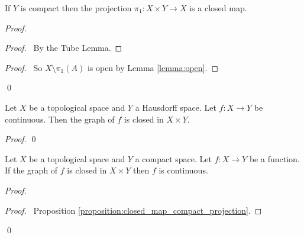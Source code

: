 \begin{proposition}
    \label{proposition:closed_map_compact_projection}
    If $Y$ is compact then the projection $\pi_1 : X \times Y \rightarrow X$
    is a closed map.
\end{proposition}

\begin{proof}
    \pf
    \begin{proof}
        \pf\ By the Tube Lemma.
    \end{proof}
    \qedstep
    \begin{proof}
        \pf\ So $X \setminus \pi_1(A)$ is open by Lemma \ref{lemma:open}.
    \end{proof}
    \qed
\end{proof}

\begin{proposition}
    \label{proposition:graph_closed}
    Let $X$ be a topological space and $Y$ a Hausdorff space.
    Let $f : X \rightarrow Y$ be continuous. Then the graph of $f$
    is closed in $X \times Y$.
\end{proposition}

\begin{proof}
    \qed
\end{proof}

\begin{theorem}
    Let $X$ be a topological space and $Y$ a compact space. Let $f : X \rightarrow Y$ be a function. 
    If the graph of $f$ is closed in $X \times Y$ then $f$ is continuous.
\end{theorem}

\begin{proof}
    \pf
        \begin{proof}
            \pf\ Proposition \ref{proposition:closed_map_compact_projection}.
        \end{proof}
    \qed
\end{proof}

